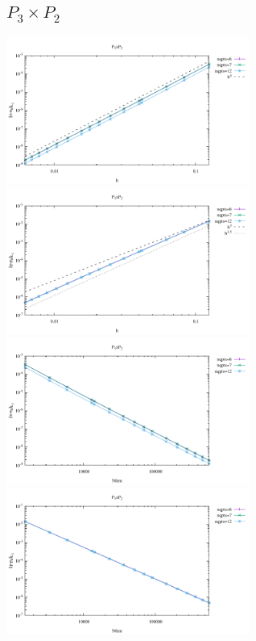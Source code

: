 \subsection*{$P_3\times P_2$}
\begin{center}
\includegraphics[width=8cm]{python_codes/fieldstone_120/results/P3P2-velocity-h.pdf}
\includegraphics[width=8cm]{python_codes/fieldstone_120/results/P3P2-pressure-h.pdf}
\includegraphics[width=8cm]{python_codes/fieldstone_120/results/P3P2-velocity-Nfem.pdf}
\includegraphics[width=8cm]{python_codes/fieldstone_120/results/P3P2-pressure-Nfem.pdf}
\end{center}

